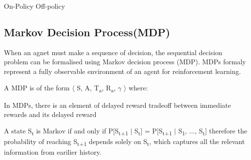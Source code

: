 \documentclass[12pt,twoside]{report}
\DeclareMathOperator{\E}{\mathbb{E}}
\begin{document}


On-Policy
Off-policy

\subsection{Markov Decision Process(MDP)}

When an agnet must make a sequence of decision, the sequential decision problem can be formalised using Markov decision process (MDP). MDPs formaly represent a fully observable environment of an agent for reinforcement learning.

A MDP is of the form $\langle$ S, A, T\textsubscript{a}, R\textsubscript{a}, $\gamma$ $\rangle$ where: \\



In MDPs, there is an element of delayed reward tradeoff between immediate rewards and its delayed reward

A state S\textsubscript{t} is Markov if and only if
P[S\textsubscript{t+1} $\vert$ S\textsubscript{t}] = P[S\textsubscript{t+1} $\vert$ S\textsubscript{1}, ..., S\textsubscript{t}] therefore the probability of reaching S\textsubscript{t+1} depends solely on S\textsubscript{t}, which captures all the relevant information from earilier history.
\end{document}
